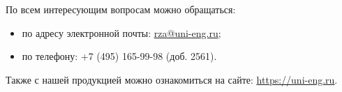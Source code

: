 \vspace{10mm}
По всем интересующим вопросам можно обращаться:
\begin{itemize}
  \item по адресу электронной почты: \href{mailto:rza@uni-eng.ru}{\color{unimain}\uline{rza@uni-eng.ru}};
  \item по телефону: +7 (495) 165-99-98 (доб. 2561).
\end{itemize}
Также с нашей продукцией можно ознакомиться на сайте: \href{https://uni-eng.ru}{\color{unimain}\uline{https://uni-eng.ru}}.